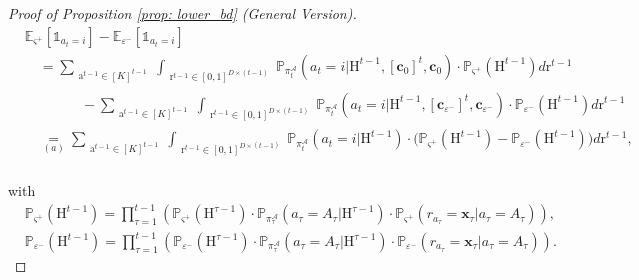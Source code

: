 \begin{proof}[Proof of Proposition \ref{prop: lower_bd} (General Version)]
\begin{equation}
\label{eq: E_0-E_epsilon}
\begin{aligned}
& \mathbb{E}_{\varsigma^{+}}[ \mathds{1}_{a_t = i} ] - \mathbb{E}_{\varepsilon^{-}}[ \mathds{1}_{a_t = i} ] \\
& \quad = 
\sum_{\substack{\boldsymbol{\mathrm{a}}^{t-1} \in [K]^{t-1}}} \int_{\substack{\boldsymbol{\mathrm{r}}^{t-1} \in [0,1]^{D \times (t-1)}}}
\mathbb{P}_{\pi_t^{\mathcal{A}}} (a_t=i | \boldsymbol{\mathrm{H}}^{t-1}, [\boldsymbol{c}_0]^{t}, \boldsymbol{c}_0)
\cdot
\mathbb{P}_{\varsigma^{+}}(\boldsymbol{\mathrm{H}}^{t-1} ) 
d\boldsymbol{\mathrm{r}}^{t-1} \\
& \quad \quad \quad \quad -
\sum_{\substack{\boldsymbol{\mathrm{a}}^{t-1} \in [K]^{t-1}}} \int_{\substack{\boldsymbol{\mathrm{r}}^{t-1} \in [0,1]^{D \times (t-1)}}}
\mathbb{P}_{\pi_t^{\mathcal{A}}} (a_t=i | \boldsymbol{\mathrm{H}}^{t-1}, [\boldsymbol{c}_{\varepsilon^{-}}]^{t}, \boldsymbol{c}_{\varepsilon^{-}})
\cdot
\mathbb{P}_{\varepsilon^{-}}(\boldsymbol{\mathrm{H}}^{t-1} ) 
d\boldsymbol{\mathrm{r}}^{t-1} \\
& \quad \underset{(a)}{=}
\sum_{\substack{\boldsymbol{\mathrm{a}}^{t-1} \in [K]^{t-1}}} \int_{\substack{\boldsymbol{\mathrm{r}}^{t-1} \in [0,1]^{D \times (t-1)}}}
\mathbb{P}_{\pi_t^{\mathcal{A}}} (a_t=i | \boldsymbol{\mathrm{H}}^{t-1})
\cdot
\bigg(
\mathbb{P}_{\varsigma^{+}}(\boldsymbol{\mathrm{H}}^{t-1} )
-
\mathbb{P}_{\varepsilon^{-}}(\boldsymbol{\mathrm{H}}^{t-1} )
\bigg )
d\boldsymbol{\mathrm{r}}^{t-1}, \\
\end{aligned}
\end{equation}

with 
\begin{equation}
\label{eq: P_0=P_epsilon}
\begin{aligned}
& \mathbb{P}_{\varsigma^{+}}(\boldsymbol{\mathrm{H}}^{t-1} ) 
= \prod_{\tau=1}^{t-1}
\left(
\mathbb{P}_{\varsigma^{+}}(\boldsymbol{\mathrm{H}}^{\tau-1})
\cdot
\mathbb{P}_{\pi_{\tau}^{\mathcal{A}}}(a_{\tau} = A_{\tau}| \boldsymbol{\mathrm{H}}^{\tau-1} )
\cdot
\mathbb{P}_{\varsigma^{+}}(r_{a_{\tau}} = \boldsymbol{x}_{\tau} | a_{\tau}=A_{\tau})
\right) , \\
& \mathbb{P}_{\varepsilon^{-}}(\boldsymbol{\mathrm{H}}^{t-1} ) 
= \prod_{\tau=1}^{t-1}
\left(
\mathbb{P}_{\varepsilon^{-}}(\boldsymbol{\mathrm{H}}^{\tau-1})
\cdot
\mathbb{P}_{\pi_{\tau}^{\mathcal{A}}}(a_{\tau} = A_{\tau}| \boldsymbol{\mathrm{H}}^{\tau-1} )
\cdot
\mathbb{P}_{\varepsilon^{-}}(r_{a_{\tau}} = \boldsymbol{x}_{\tau} | a_{\tau}=A_{\tau})
\right).
\end{aligned}
\end{equation}


\end{proof}
